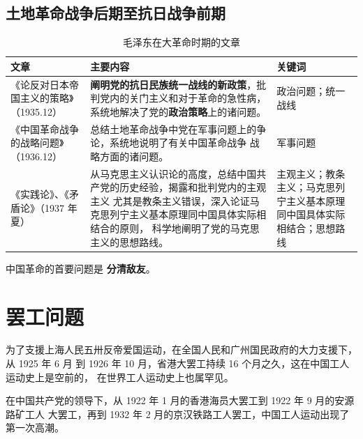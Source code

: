 \documentclass[10pt, UTF8]{book} %
\begin{document}
\subsection{土地革命战争后期至抗日战争前期}

\begin{table}[H]
    \centering
    \caption{毛泽东在大革命时期的文章}
    \begin{tabular}{p{}|p{}p{}}
        \hline 
        \textbf{文章} & \textbf{主要内容} & \textbf{关键词} \\
        \hline
        《论反对日本帝国主义的策略》（1935.12）&
        \textbf{阐明党的抗日民族统一战线的新政策}，批判党内的关门主义和对于革命的急性病，
        系统地解决了党的\textbf{政治策略}上的诸问题。
        & 政治问题；统一战线 \\ 
        \hline
        《中国革命战争的战略问题》（1936.12） &
        总结土地革命战争中党在军事问题上的争论，系统地说明了有关中国革命战争
        战略方面的诸问题。
        & 军事问题 \\ 
        \hline 
        《实践论》、《矛盾论》（1937 年夏）
        & 从马克思主义认识论的高度，总结中国共产党的历史经验，揭露和批判党内的主观主义
        尤其是教条主义错误，深入论证马克思列宁主义基本原理同中国具体实际相结合的原则，
        科学地阐明了党的马克思主义的思想路线。
        & 主观主义；教条主义；马克思列宁主义基本原理同中国具体实际相结合；思想路线 \\
        \hline 
    \end{tabular}
\end{table}

\begin{example}
    中国革命的首要问题是 \textbf{分清敌友}。
\end{example}

\section{罢工问题}

为了支援上海人民五卅反帝爱国运动，在全国人民和广州国民政府的大力支援下，从 1925 年 6 月
到 1926 年 10 月，省港大罢工持续 16 个月之久，这在中国工人运动史上是空前的，
在世界工人运动史上也属罕见。

在中国共产党的领导下，从 1922 年 1 月的香港海员大罢工到 1922 年 9 月的安源路矿工人
大罢工，再到 1932 年 2 月的京汉铁路工人罢工，中国工人运动出现了第一次高潮。



\end{document}
